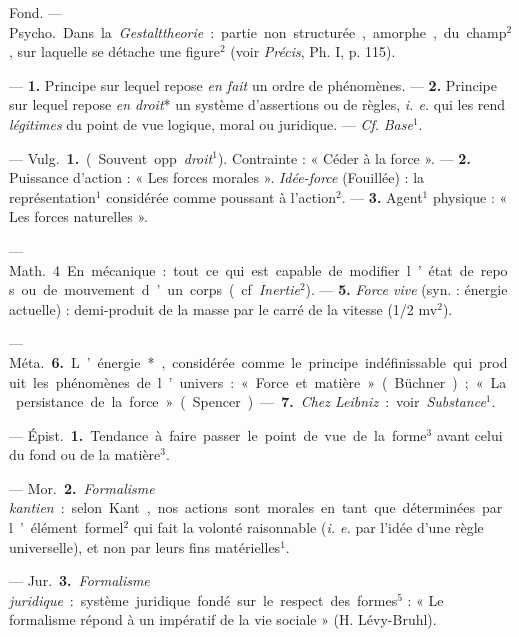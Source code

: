 \begin{itemize}[leftmargin=1cm, label=, itemsep=1pt]
Fond. — \si{Psycho.} Dans la {\it Gestalttheorie} : partie non structurée,
amorphe, du champ$^2$, sur laquelle se détache une figure$^2$
(voir {\it Précis}, Ph. I, p. 115).

 — {\bf 1.} Principe sur lequel repose {\it en fait} un ordre
de phénomènes. — {\bf 2.} Principe sur lequel repose {\it en droit}* un
système d’assertions ou de règles, {\it i. e.} qui les rend {\it légitimes}
du point de vue logique, moral ou juridique. — {\it Cf.} {\it Base}$^1$.

 — \si{Vulg.} {\bf 1.} (Souvent opp. {\it droit}$^1$). Contrainte :
« Céder à la force ». — {\bf 2.} Puissance d'action : « Les forces morales ».
{\it Idée-force} (Fouillée) : la représentation$^1$ considérée comme poussant
à l’action$^2$. — {\bf 3.} Agent$^1$ physique : « Les forces naturelles ».

— \si{Math.} 4 En mécanique : tout ce qui est capable de modifier l’état de
repos ou de mouvement d’un corps (cf. {\it Inertie}$^2$). — {\bf 5.}
{\it Force vive} (syn. : énergie actuelle) : demi-produit de la masse par le
carré de la vitesse (1/2 mv$^2$).

— \si{Méta.} {\bf 6.} L’énergie*, considérée comme le principe indéfinissable
qui produit les phénomènes de l’univers : « Force et matière » (Büchner) ;
« La persistance de la force » (Spencer). — {\bf 7.} {\it Chez Leibniz} :
voir {\it Substance}$^1$.

 — \si{Épist.} {\bf 1.} Tendance à
faire passer le point de vue de la
forme$^3$ avant celui du fond ou de la matière$^3$.

— \si{Mor.} {\bf 2.} {\it Formalisme kantien} : selon Kant, nos actions sont
morales en tant que déterminées par l’élément formel$^2$ qui fait la volonté
raisonnable ({\it i. e.} par l’idée d’une règle universelle), et non par
leurs fins matérielles$^1$.

— \si{Jur.} {\bf 3.} {\it Formalisme juridique} : système juridique fondé sur
le respect des formes$^5$ : « Le formalisme répond à un impératif de la vie
sociale » (H. Lévy-Bruhl).


\end{itemize}
